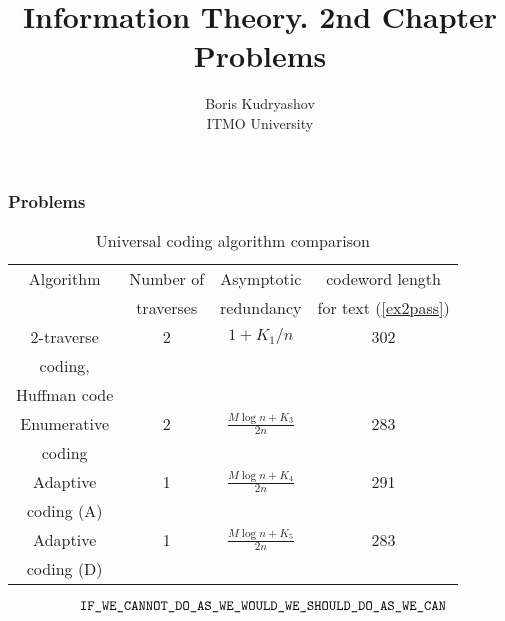 \documentclass[14pt]{beamer}
\title{\small{Information Theory. 2nd Chapter Problems}}
\author{\huge{
Boris Kudryashov \\
\vspace{30pt}
ITMO University
}}
\begin{document}
\maketitle

\begin{frame}
\frametitle{Problems}
\begin{enumerate}

\footnotesize {
  
  \begin{table}[htbp]
\caption{Universal coding algorithm comparison}
\begin{center}
\begin{tabular}
{|c|c|c|c|}  \hline %
Algorithm & Number of  & Asymptotic &   codeword length  \\ %
          & traverses  & redundancy &   for text (\ref{ex2pass})    \\%
\hline %
2-traverse  & 2& $1 + K_1 / n$& 302 \\%
coding, &  &  &  \\ %
Huffman code &  &  &  \\ \hline%
Enumerative & 2& $\frac{M\log n + K_3 }{2n}$& 283 \\ %
coding      &  &  &  \\\hline %
 Adaptive & 1& $\frac{M\log n + K_4 }{2n}$& 291 \\%
 coding (A) &  &  &   \\\hline %
Adaptive  & 1& $\frac{M\log n + K_5 }{2n}$&283 \\%
coding (D) &  &  &  \\\hline
\end{tabular}
\label{tab3_6} \end{center}
\end{table}
  
  
\begin{equation}
\label{ex2pass} {\texttt{
IF{\_}WE{\_}CANNOT{\_}DO{\_}AS{\_}WE{\_}WOULD{\_}WE{\_}SHOULD{\_}DO{\_}AS{\_}WE{\_}CAN} }\\
\end{equation}
  
 }
\end{enumerate}
\end{frame}

  
\end{document}
